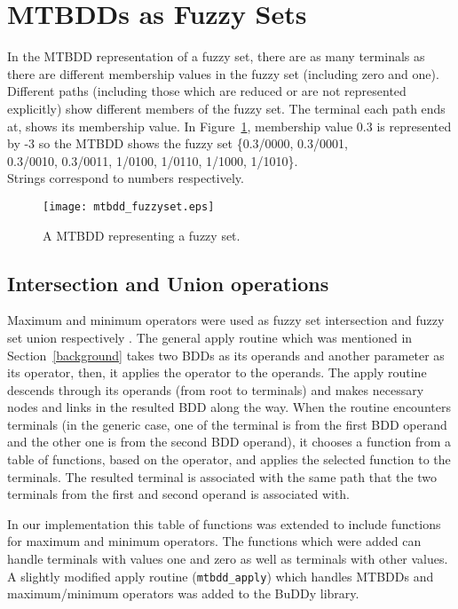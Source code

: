 \documentclass[4pt]{article}
\begin{document}
\section{MTBDDs as Fuzzy Sets}
\label{mtbdd_fuzzyset_sec}
In the MTBDD representation of a fuzzy set, there are as many terminals as there are different membership values in the fuzzy set (including zero and one). Different paths (including those which are reduced or are not represented explicitly) show different members of the fuzzy set. The terminal each path ends at, shows its membership value. In Figure~\ref{mtbdd_fuzzyset}, membership value 0.3 is represented by -3 so the MTBDD shows the fuzzy set \{0.3/0000, 0.3/0001,\\ 0.3/0010, 0.3/0011, 1/0100, 1/0110, 1/1000, 1/1010\}.\\Strings  correspond to numbers  respectively.
\begin{figure} [ht]
\begin{center}
\texttt{[image: mtbdd\_fuzzyset.eps]}
\end{center}
\caption{A MTBDD representing a fuzzy set.}
\label{mtbdd_fuzzyset}
\end{figure}

\subsection{Intersection and Union operations}
\label{intersection_union}
Maximum and minimum operators were used as fuzzy set intersection and fuzzy set union respectively \cite{zadeh}. The general apply routine which was mentioned in Section~\ref{background} takes two BDDs as its operands and another parameter as its operator, then, it applies the operator to the operands. The apply routine descends through its operands (from root to terminals) and makes necessary nodes and links in the resulted BDD along the way. When the routine encounters terminals (in the generic case, one of the terminal is from the first BDD operand and the other one is from the second BDD operand), it chooses a function from a table of functions, based on the operator, and applies the selected function to the terminals. The resulted terminal is associated with the same path that the two terminals from the first and second operand is associated with.

In our implementation this table of functions was extended to include functions for maximum and minimum operators. The functions which were added can handle terminals with values one and zero as well as terminals with other values. A slightly modified apply routine (\verb=mtbdd_apply=) which handles MTBDDs and maximum/minimum operators was added to the BuDDy library.  
\end{document}
